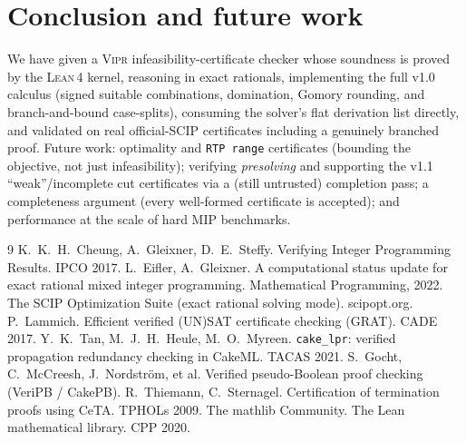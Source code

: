 \documentclass[runningheads]{llncs}
\newcommand{\code}[1]{\texttt{#1}}
\newcommand{\scip}{\textsc{SCIP}}
\newcommand{\vipr}{\textsc{Vipr}}
\newcommand{\lean}{\textsc{Lean\,4}}
\begin{document}
\section{Conclusion and future work}\label{sec:concl}

We have given a \vipr{} infeasibility-certificate checker whose soundness is proved by
the \lean{} kernel, reasoning in exact rationals, implementing the full v1.0 calculus
(signed suitable combinations, domination, Gomory rounding, and branch-and-bound
case-splits), consuming the solver's flat derivation list directly, and validated on real
official-\scip{} certificates including a genuinely branched proof. Future work: optimality
and \code{RTP range} certificates (bounding the objective, not just infeasibility);
verifying \emph{presolving} and supporting the v1.1 ``weak''/incomplete cut certificates
via a (still untrusted) completion pass; a completeness argument (every well-formed
certificate is accepted); and performance at the scale of hard MIP benchmarks.

\begin{thebibliography}{9}
 K.\ K.\ H.\ Cheung, A.\ Gleixner, D.\ E.\ Steffy.
  Verifying Integer Programming Results. IPCO 2017.
 L.\ Eifler, A.\ Gleixner.
  A computational status update for exact rational mixed integer programming.
  Mathematical Programming, 2022.
 The SCIP Optimization Suite (exact rational solving mode). scipopt.org.
 P.\ Lammich. Efficient verified (UN)SAT certificate checking (GRAT). CADE 2017.
 Y.\ K.\ Tan, M.\ J.\ H.\ Heule, M.\ O.\ Myreen. \code{cake\_lpr}: verified
  propagation redundancy checking in CakeML. TACAS 2021.
 S.\ Gocht, C.\ McCreesh, J.\ Nordstr\"om, et al. Verified pseudo-Boolean
  proof checking (VeriPB / CakePB).
 R.\ Thiemann, C.\ Sternagel. Certification of termination proofs using CeTA. TPHOLs 2009.
 The mathlib Community. The Lean mathematical library. CPP 2020.
\end{thebibliography}
\end{document}
